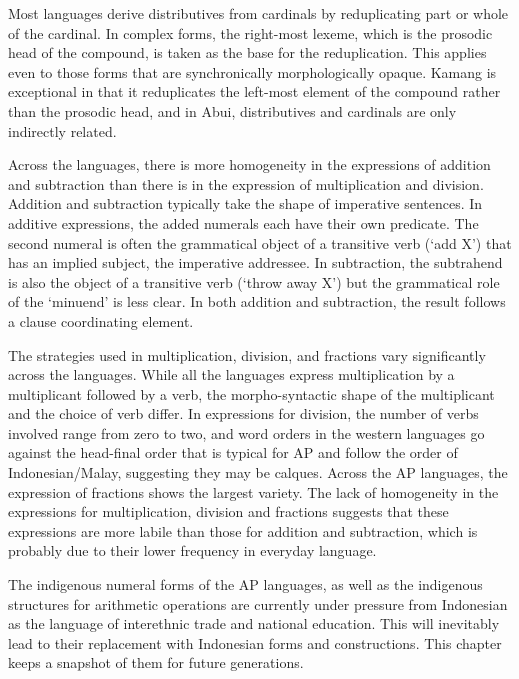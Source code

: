 Most languages derive distributives from cardinals by reduplicating part or whole of the cardinal. In complex forms, the right-most lexeme, which is the prosodic head of the compound, is taken as the base for the reduplication. This applies even to those forms that are synchronically morphologically opaque. Kamang is exceptional in that it reduplicates the left-most element of the compound rather than the prosodic head, and in Abui, distributives and cardinals are only indirectly related. 

Across the languages, there is more homogeneity in the expressions of addition and subtraction than there is in the expression of multiplication and division. Addition and subtraction typically take the shape of imperative sentences. In additive expressions, the added numerals each have their own predicate. The second numeral is often the grammatical object of a transitive verb ({\textquoteleft}add X{\textquoteright}) that has an implied subject, the imperative addressee. In subtraction, the subtrahend is also the object of a transitive verb ({\textquoteleft}throw away X{\textquoteright}) but the grammatical role of the {\textquoteleft}minuend{\textquoteright} is less clear. In both addition and subtraction, the result follows a clause coordinating element.

The strategies used in multiplication, division, and fractions vary significantly across the languages. While all the languages express multiplication by a multiplicant followed by a verb, the morpho-syntactic shape of the multiplicant and the choice of verb differ. In expressions for division, the number of verbs involved range from zero to two, and word orders in the western languages go against the head-final order that is typical for AP and follow the order of Indonesian/Malay, suggesting they may be calques. Across the AP languages, the expression of fractions shows the largest variety. The lack of homogeneity in the expressions for multiplication, division and fractions suggests that these expressions are more labile than those for addition and subtraction, which is probably due to their lower frequency in everyday language.

The indigenous numeral forms of the AP languages, as well as the indigenous structures for arithmetic operations are currently under pressure from Indonesian as the language of interethnic trade and national education. This will inevitably lead to their replacement with Indonesian forms and constructions. This chapter keeps a snapshot of them for future generations. 

